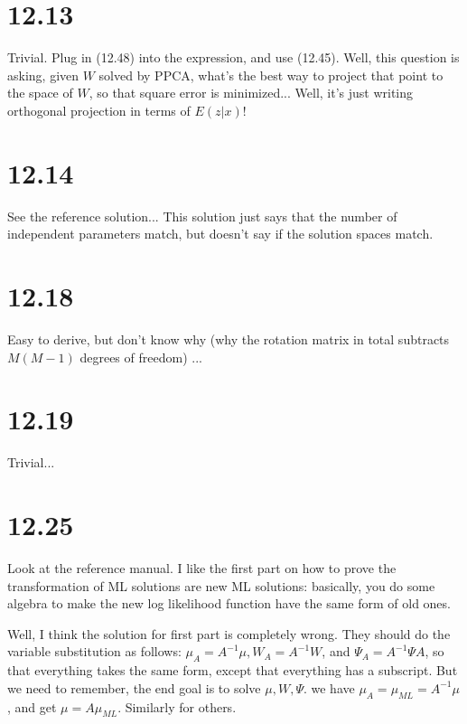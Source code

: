 \documentclass[12pt]{article}
\begin{document}

\section{12.13} %
\label{sec:12_13}
Trivial. Plug in (12.48) into the expression, and use (12.45). Well, this question is asking, given $W$ solved by PPCA, what's the best way to project that point to the space of $W$, so that square error is minimized... Well, it's just writing orthogonal projection in terms of $E(z|x)$!

\section{12.14} %
\label{sec:12_14}
See the reference solution... This solution just says that the number of independent parameters match, but doesn't say if the solution spaces match.

\section{12.18} %
\label{sec:12_18}
Easy to derive, but don't know why (why the rotation matrix in total subtracts $M(M-1)$ degrees of freedom) ...

\section{12.19} %
\label{sec:12_19}
Trivial...

\section{12.25} %
\label{sec:12_25}
Look at the reference manual. I like the first part on how to prove the transformation of ML solutions are new ML solutions: basically, you do some algebra to make the new log likelihood function have the same form of old ones.

Well, I think the solution for first part is completely wrong. They should do the variable substitution as follows: $\mu_A = A^{-1}\mu, W_A = A^{-1}W$, and $\Psi_A = A^{-1} \Psi A$, so that everything takes the same form, except that everything has a subscript. But we need to remember, the end goal is to solve $\mu, W, \Psi$. we have $\mu_A = \mu_{ML} = A^{-1}\mu$, and get $\mu = A \mu_{ML}$. Similarly for others.
\end{document}
